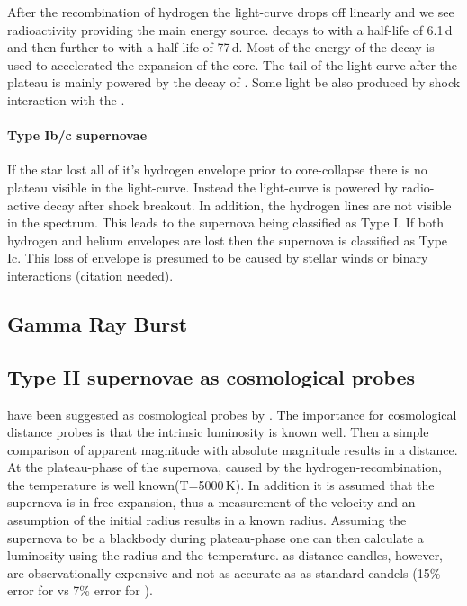 After the recombination of hydrogen the light-curve drops off linearly and we see radioactivity providing the main energy source. \nififtysix decays to \cofiftysix with a half-life of 6.1\,d and then further to \fefiftysix with a half-life of 77\,d. Most of the energy of the \nififtysix decay is used to accelerated the expansion of the core. The tail of the light-curve after the plateau is mainly powered by the decay of \cofiftysix. Some light be also produced by shock interaction with the \csm.

\paragraph{Type Ib/c supernovae}
If the star lost all of it's hydrogen envelope prior to core-collapse there is no plateau visible in the light-curve. Instead the light-curve is powered by radio-active decay after shock breakout. In addition, the hydrogen lines are not visible in the spectrum. This leads to the supernova being classified as Type I. If both hydrogen and helium envelopes are lost then the supernova is classified as Type Ic. 
This loss of envelope is presumed to be caused by stellar winds or binary interactions (citation needed). 

\subsection{Gamma Ray Burst}

\subsection{Type II supernovae as cosmological probes}
\sniip have been suggested as cosmological probes by \citet{1974ApJ...193...27K}. The importance for cosmological distance probes is that the intrinsic luminosity is known well. Then a simple comparison of apparent magnitude with absolute magnitude results in a distance. At the plateau-phase of the supernova, caused by the hydrogen-recombination,  the temperature is well known(T=5000\,K). In addition it is assumed that the supernova is in free expansion, thus a measurement of the velocity and an assumption of the initial radius results in a known radius. Assuming the supernova to be a blackbody during plateau-phase one can then calculate a luminosity using the radius and the temperature. \sniip as distance candles, however, are observationally expensive and not as accurate as \snia as standard candels (15\% error for \snii  \citep{2006ApJ...645..841N} vs 7\% error for \snia).




